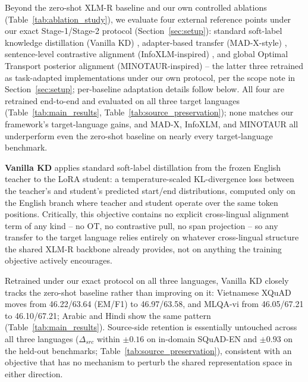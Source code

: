\documentclass[11pt]{article}
\begin{document}
Beyond the zero-shot XLM-R baseline and our own controlled ablations (Table~\ref{tab:ablation_study}), we evaluate four external reference points under our exact Stage-1/Stage-2 protocol (Section~\ref{sec:setup}): standard soft-label knowledge distillation (Vanilla KD) \citep{hinton2015distillingknowledgeneuralnetwork}, adapter-based transfer (MAD-X-style) \citep{pfeiffer-etal-2020-mad}, sentence-level contrastive alignment (InfoXLM-inspired) \citep{chi-etal-2021-infoxlm}, and global Optimal Transport posterior alignment (MINOTAUR-inspired) \citep{sherborne-etal-2023-optimal} -- the latter three retrained as task-adapted implementations under our own protocol, per the scope note in Section~\ref{sec:setup}; per-baseline adaptation details follow below. All four are retrained end-to-end and evaluated on all three target languages (Table~\ref{tab:main_results}, Table~\ref{tab:source_preservation}); none matches our framework's target-language gains, and MAD-X, InfoXLM, and MINOTAUR all underperform even the zero-shot baseline on nearly every target-language benchmark.

\textbf{Vanilla KD}
\label{sec:appendix_vanilla_kd}
\citep{hinton2015distillingknowledgeneuralnetwork} applies standard soft-label distillation from the frozen English teacher to the LoRA student: a temperature-scaled KL-divergence loss between the teacher's and student's predicted start/end distributions, computed only on the English branch where teacher and student operate over the same token positions. Critically, this objective contains no explicit cross-lingual alignment term of any kind -- no OT, no contrastive pull, no span projection -- so any transfer to the target language relies entirely on whatever cross-lingual structure the shared XLM-R backbone already provides, not on anything the training objective actively encourages.

Retrained under our exact protocol on all three languages, Vanilla KD closely tracks the zero-shot baseline rather than improving on it: Vietnamese XQuAD moves from 46.22/63.64 (EM/F1) to 46.97/63.58, and MLQA-vi from 46.05/67.21 to 46.10/67.21; Arabic and Hindi show the same pattern (Table~\ref{tab:main_results}). Source-side retention is essentially untouched across all three languages ($\Delta_{src}$ within $\pm0.16$ on in-domain SQuAD-EN and $\pm0.93$ on the held-out benchmarks; Table~\ref{tab:source_preservation}), consistent with an objective that has no mechanism to perturb the shared representation space in either direction.
\end{document}

